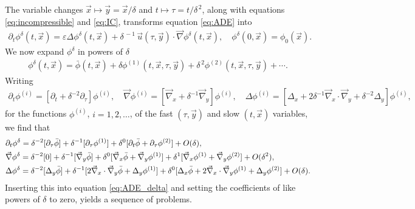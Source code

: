 \documentclass[11pt]{amsart}
\begin{document}
The variable changes $\vec{x}\mapsto\vec{y}=\vec{x}/\delta$ and
$t\mapsto\tau=t/\delta^{\,2}$, along with equations \eqref{eq:incompressible} and
\eqref{eq:IC}, transforms equation \eqref{eq:ADE} into
\cite{McLaughlin:SIAM_JAM:780}    
%
\begin{align}\label{eq:ADE_delta}
  \partial_t\phi^\delta(t,\vec{x})=\varepsilon\Delta\phi^\delta(t,\vec{x})
                 +\delta^{\,-1}\,\vec{u}(\tau,\vec{y})\cdot\vec{\nabla}\phi^\delta(t,\vec{x}), \quad
      \phi^\delta(0,\vec{x})=\phi_0(\vec{x}).
\end{align}
%
We now expand $\phi^\delta$ in powers of $\delta$ \cite{McLaughlin:SIAM_JAM:780} 
%
\begin{align}\label{eq:Expand}
  \phi^\delta(t,\vec{x})=\bar{\phi}(t,\vec{x})
                 +\delta\phi^{(1)}(t,\vec{x},\tau,\vec{y})
                 +\delta^{\,2}\phi^{(2)}(t,\vec{x},\tau,\vec{y})+\cdots.
\end{align}
%
Writing
%
\begin{align*}
  \partial_t\phi^{(i)}=[\partial_t+\delta^{-2}\partial_\tau]\phi^{(i)}, \quad
  \vec{\nabla}\phi^{(i)}=[\vec{\nabla}_x+\delta^{-1}\vec{\nabla}_y]\phi^{(i)}, \quad
  \Delta\phi^{(i)}=[\Delta_x+2\delta^{-1}\vec{\nabla}_x\cdot\vec{\nabla}_y+\delta^{-2}\Delta_y]\phi^{(i)},
\end{align*}
%
for the functions $\phi^{(i)}$, $i=1,2,\ldots$, of the fast $(\tau,\vec{y})$ and
slow $(t,\vec{x})$ variables, we find that
%
\begin{align}
  &\partial_t\phi^\delta=\delta^{-2}[\partial_\tau\bar{\phi}]
      +\delta^{-1}[\partial_\tau\phi^{(1)}]
      +\delta^0[\partial_t\bar{\phi}+\partial_\tau\phi^{(2)}]+O(\delta),
      \\
  &\vec{\nabla}\phi^\delta=\delta^{-2}[0]
            +\delta^{-1}[\vec{\nabla}_y\bar{\phi}]
            +\delta^0[\vec{\nabla}_x\bar{\phi}+\vec{\nabla}_y\phi^{(1)}]
            +\delta^1[\vec{\nabla}_x\phi^{(1)}+\vec{\nabla}_y\phi^{(2)}]+O(\delta^2),
            \notag\\
  &\Delta\phi^\delta=\delta^{-2}[\Delta_y\bar{\phi}]
      +\delta^{-1}[2\vec{\nabla}_x\cdot\vec{\nabla}_y\bar{\phi}+\Delta_y\phi^{(1)}]
      +\delta^0[\Delta_x\bar{\phi}+2\vec{\nabla}_x\cdot\vec{\nabla}_y\phi^{(1)}+\Delta_y\phi^{(2)}]+O(\delta).
      \notag
\end{align}
%
Inserting this into equation \eqref{eq:ADE_delta} and setting the
coefficients of like powers of $\delta$ to zero, yields a sequence of
problems.
\end{document}
